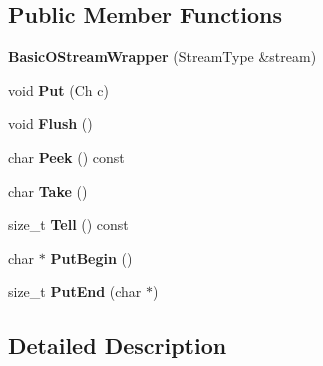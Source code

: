 \subsection*{Public Member Functions}
\begin{DoxyCompactItemize}
\item 
{\bfseries Basic\+O\+Stream\+Wrapper} (Stream\+Type \&stream)\hypertarget{classBasicOStreamWrapper_a067a516c13b7c9d4dacef598d32779ef}{}\label{classBasicOStreamWrapper_a067a516c13b7c9d4dacef598d32779ef}

\item 
void {\bfseries Put} (Ch c)\hypertarget{classBasicOStreamWrapper_a7d3ba9d651fbe27fe05387f512154ea8}{}\label{classBasicOStreamWrapper_a7d3ba9d651fbe27fe05387f512154ea8}

\item 
void {\bfseries Flush} ()\hypertarget{classBasicOStreamWrapper_a1c48a8b7520b0ab6ca34e665b928b56d}{}\label{classBasicOStreamWrapper_a1c48a8b7520b0ab6ca34e665b928b56d}

\item 
char {\bfseries Peek} () const \hypertarget{classBasicOStreamWrapper_a81eda65252d99c350d754bb702526dae}{}\label{classBasicOStreamWrapper_a81eda65252d99c350d754bb702526dae}

\item 
char {\bfseries Take} ()\hypertarget{classBasicOStreamWrapper_a54be63e8d24f4d82329b860a907f65fe}{}\label{classBasicOStreamWrapper_a54be63e8d24f4d82329b860a907f65fe}

\item 
size\+\_\+t {\bfseries Tell} () const \hypertarget{classBasicOStreamWrapper_ab5f119855c8591b650fbcbeb99be677e}{}\label{classBasicOStreamWrapper_ab5f119855c8591b650fbcbeb99be677e}

\item 
char $\ast$ {\bfseries Put\+Begin} ()\hypertarget{classBasicOStreamWrapper_a564b7b727bdab12185e7a7bd1ac5e822}{}\label{classBasicOStreamWrapper_a564b7b727bdab12185e7a7bd1ac5e822}

\item 
size\+\_\+t {\bfseries Put\+End} (char $\ast$)\hypertarget{classBasicOStreamWrapper_a1da108e43a5a517c4484821fced1fca0}{}\label{classBasicOStreamWrapper_a1da108e43a5a517c4484821fced1fca0}

\end{DoxyCompactItemize}


\subsection{Detailed Description}

